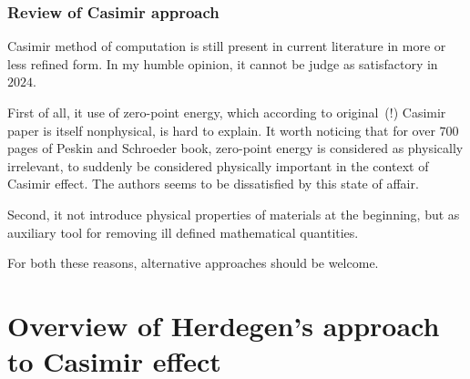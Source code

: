 \documentclass[10pt,t]{beamer}
\begin{document}
\begin{frame}
  \frametitle{Review of Casimir approach}


  Casimir method of computation is still present in current literature in
  more or less refined form. In my humble opinion, it cannot be judge as
  satisfactory in $2024$.

  First of all, it use of zero-point energy, which according to
  original~(!) Casimir paper is itself nonphysical, is hard to explain.
  It worth noticing that for over $700$ pages of Peskin and Schroeder book,
  zero-point energy is considered as physically irrelevant, to suddenly be
  considered physically important in the context of Casimir effect.
  The authors seems to be dissatisfied by this state of affair.

  Second, it not introduce physical properties of materials at the beginning,
  but as auxiliary tool for removing ill defined mathematical quantities.

  For both these reasons, alternative approaches should be welcome.

\end{frame}










\section{Overview of Herdegen's approach to Casimir effect}
\end{document}
